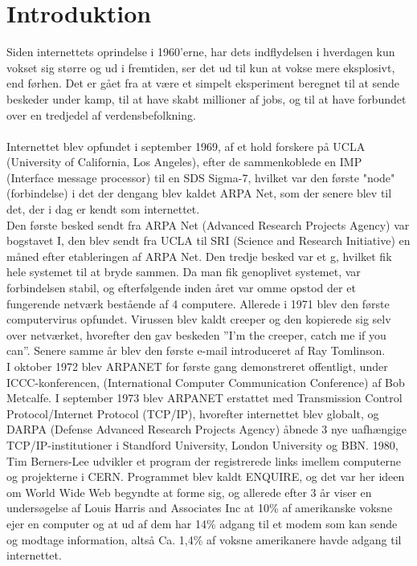 \newpage
\chapter{Introduktion}
 
    Siden internettets oprindelse i 1960’erne, har dets indflydelsen i hverdagen kun vokset sig større og ud i fremtiden, ser det ud til kun at vokse mere eksplosivt, end førhen. Det er gået fra at være et simpelt eksperiment beregnet til at sende beskeder under kamp, til at have skabt millioner af jobs, og til at have forbundet over en tredjedel af verdensbefolkning.
    \\\\
Internettet blev opfundet i september 1969, af et hold forskere på UCLA (University of California, Los Angeles), efter de sammenkoblede en IMP (Interface message processor) til en SDS Sigma-7, hvilket var den første "node" (forbindelse) i det der dengang blev kaldet ARPA Net, som der senere blev til det, der i dag er kendt som internettet.\\
    Den første besked sendt fra ARPA Net (Advanced Research Projects Agency) var bogstavet I, den blev sendt fra UCLA til SRI (Science and Research Initiative) en måned efter etableringen af ARPA Net. 
    Den tredje besked var et g, hvilket fik hele systemet til at bryde sammen. Da man fik genoplivet systemet, var forbindelsen stabil, og efterfølgende inden året var omme opstod der et fungerende netværk bestående af 4 computere.
    Allerede i 1971 blev den første computervirus opfundet. Virussen blev kaldt creeper og den kopierede sig selv over netværket, hvorefter den gav beskeden ”I’m the creeper, catch me if you can”. Senere samme år blev den første e-mail introduceret af Ray Tomlinson.\\
    I oktober 1972 blev ARPANET for første gang demonstreret offentligt, under ICCC-konferencen, (International Computer Communication Conference) af Bob Metcalfe. I september 1973 blev ARPANET erstattet med Transmission Control Protocol/Internet Protocol (TCP/IP), hvorefter internettet blev globalt, og DARPA (Defense Advanced Research Projects Agency) åbnede 3 nye uafhængige TCP/IP-institutioner i Standford University, London University og BBN.
    1980, Tim Berners-Lee udvikler et program der registrerede links imellem computerne og projekterne i CERN. 
    Programmet blev kaldt ENQUIRE, og det var her ideen om World Wide Web begyndte at forme sig, og allerede efter 3 år viser en undersøgelse af Louis Harris and Associates Inc at 10\% af amerikanske voksne ejer en computer og at ud af dem har 14\% adgang til et modem som kan sende og modtage information, altså Ca. 1,4\% af voksne amerikanere havde adgang til internettet. 
